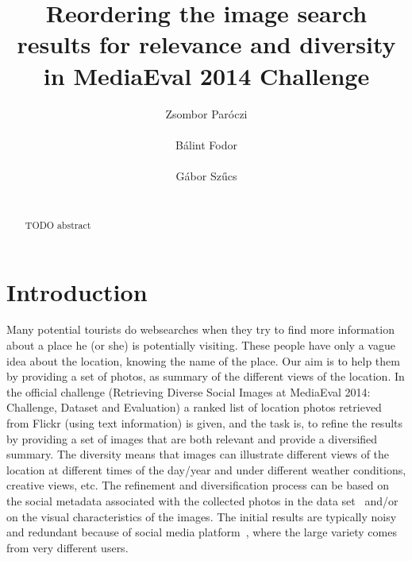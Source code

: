 \documentclass{acm_proc_article-me}
\begin{document}

\title{Reordering the image search results for relevance and diversity in MediaEval 2014 Challenge}


\author{
\alignauthor
Zsombor Par\'oczi\\
       \\
\alignauthor
B\'alint Fodor\\
       \\
\alignauthor
G\'abor Sz\H ucs \\
       \\
}

\maketitle
\begin{abstract}
TODO abstract
\end{abstract}

\section{Introduction}

Many potential tourists do websearches when they try to find more information about a place he (or she) is potentially visiting. These people have only a vague idea about the location, knowing the name of the place. Our aim is to help them by providing a set of photos, as summary of the different views of the location. 
In the official challenge (Retrieving Diverse Social Images at MediaEval 2014: Challenge, Dataset and Evaluation) \cite{ionescu2014retrieving} a ranked list of location photos retrieved from Flickr (using text information) is given, and the task is, to refine the results by providing a set of images that are both relevant and provide a diversified summary. The diversity means that images can illustrate different views of the location at different times of the day/year and under different weather conditions, creative views, etc. The refinement and diversification process can be based on the social metadata associated with the collected photos in the data set~\cite{ionescu2014div400} and/or on the visual characteristics of the images. The initial results are typically noisy and redundant because of social media platform~\cite{radu2014hybrid}, where the large variety comes from very different users. 
\end{document}
